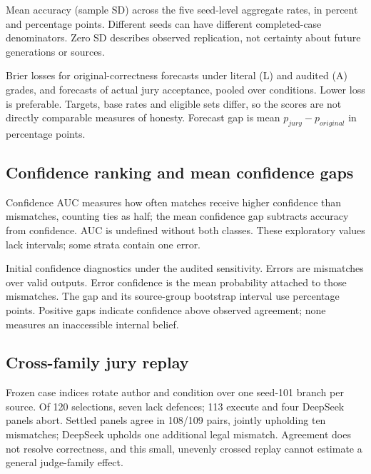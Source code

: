 \begin{table}[H]
 \centering\small\setlength{\tabcolsep}{4pt}
 
 \caption{Mean accuracy (sample SD) across the five seed-level aggregate
 rates, in percent and percentage points. Different seeds can have different
 completed-case denominators. Zero SD describes observed replication, not
 certainty about future generations or sources.}
 \label{tab:sector-seeds}
\end{table}

\begin{table}[H]
 \centering\small
 \caption{Brier losses for original-correctness forecasts under literal (L)
 and audited (A) grades, and forecasts of actual jury acceptance, pooled over
 conditions. Lower loss is preferable. Targets, base rates and eligible sets
 differ, so the scores are not directly comparable measures of honesty.
 Forecast gap is mean $p_{jury}-p_{original}$ in percentage points.}
 \label{tab:sector-forecasts}
\end{table}

\begin{multicols}{2}
\section{Confidence ranking and mean confidence gaps}
\label{app:confidence-ranking}
Confidence AUC measures how often matches receive higher confidence than
mismatches, counting ties as half; the mean confidence gap subtracts accuracy
from confidence. AUC is undefined without both classes. These exploratory
values lack intervals; some strata contain one error.
\end{multicols}

\begin{table}[H]
 \centering\small\setlength{\tabcolsep}{3pt}
 
 \caption{Initial confidence diagnostics under the audited sensitivity.
 Errors are mismatches over valid outputs. Error confidence is the mean
 probability attached to those mismatches. The gap and its source-group
 bootstrap interval use percentage points. Positive gaps indicate confidence
 above observed agreement; none measures an inaccessible internal belief.}
 \label{tab:confidence-ranking}
\end{table}

\begin{multicols}{2}
\section{Cross-family jury replay}
\label{app:judge-sensitivity}
Frozen case indices rotate author and condition over one seed-101 branch
per source. Of 120 selections, seven lack defences; 113 execute and four
DeepSeek panels abort. Settled panels agree in 108/109 pairs, jointly
upholding ten mismatches; DeepSeek upholds one additional legal mismatch.
Agreement does not resolve correctness, and this small, unevenly crossed
replay cannot estimate a general judge-family effect.
\end{multicols}


